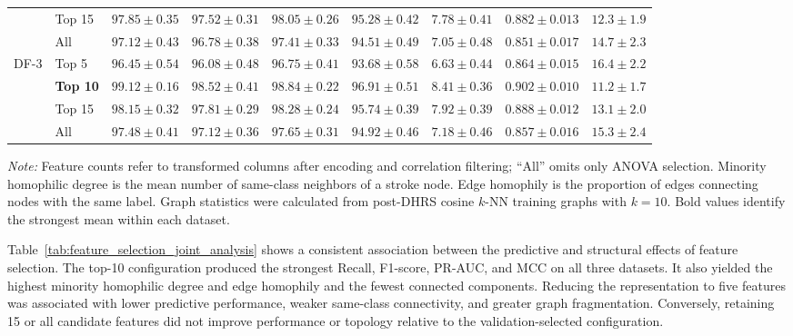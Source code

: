 \documentclass[pdflatex,sn-mathphys-num]{sn-jnl}%
\theoremstyle{thmstyleone}%
\theoremstyle{thmstyletwo}%
\theoremstyle{thmstylethree}%
\begin{document}
\begin{table}[!ht]
{\begin{tabular}{@{}llccccccc@{}}
& Top 15
& $97.85\pm0.35$
& $97.52\pm0.31$
& $98.05\pm0.26$
& $95.28\pm0.42$
& $7.78\pm0.41$
& $0.882\pm0.013$
& $12.3\pm1.9$ \\

& All
& $97.12\pm0.43$
& $96.78\pm0.38$
& $97.41\pm0.33$
& $94.51\pm0.49$
& $7.05\pm0.48$
& $0.851\pm0.017$
& $14.7\pm2.3$ \\
\midrule

\multirow{4}{*}{DF-3}
& Top 5
& $96.45\pm0.54$
& $96.08\pm0.48$
& $96.75\pm0.41$
& $93.68\pm0.58$
& $6.63\pm0.44$
& $0.864\pm0.015$
& $16.4\pm2.2$ \\

& \textbf{Top 10}
& \textbf{$99.12\pm0.16$}
& \textbf{$98.52\pm0.41$}
& \textbf{$98.84\pm0.22$}
& \textbf{$96.91\pm0.51$}
& \textbf{$8.41\pm0.36$}
& \textbf{$0.902\pm0.010$}
& \textbf{$11.2\pm1.7$} \\

& Top 15
& $98.15\pm0.32$
& $97.81\pm0.29$
& $98.28\pm0.24$
& $95.74\pm0.39$
& $7.92\pm0.39$
& $0.888\pm0.012$
& $13.1\pm2.0$ \\

& All
& $97.48\pm0.41$
& $97.12\pm0.36$
& $97.65\pm0.31$
& $94.92\pm0.46$
& $7.18\pm0.46$
& $0.857\pm0.016$
& $15.3\pm2.4$ \\
\bottomrule
\end{tabular}%
}

\vspace{2pt}
\begin{minipage}{0.98\textwidth}
\footnotesize
\textit{Note:} Feature counts refer to transformed columns after encoding and
correlation filtering; ``All'' omits only ANOVA selection. Minority
homophilic degree is the mean number of same-class neighbors of a stroke node.
Edge homophily is the proportion of edges connecting nodes with the same
label. Graph statistics were calculated from post-DHRS cosine \(k\)-NN
training graphs with \(k=10\). Bold values identify the strongest mean within
each dataset.
\end{minipage}
\end{table}
\endgroup

 {
Table~\ref{tab:feature_selection_joint_analysis} shows a consistent
association between the predictive and structural effects of feature
selection. The top-10 configuration produced the strongest Recall, F1-score,
PR-AUC, and MCC on all three datasets. It also yielded the highest minority
homophilic degree and edge homophily and the fewest connected components.
Reducing the representation to five features was associated with lower
predictive performance, weaker same-class connectivity, and greater graph
fragmentation. Conversely, retaining 15 or all candidate features did not
improve performance or topology relative to the validation-selected
configuration.
}
\end{document}
